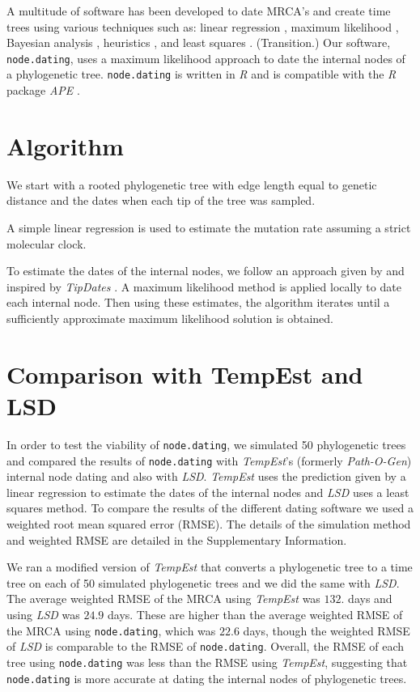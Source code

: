\documentclass{bioinfo}
\newcommand{\code}[1]{{\tt #1}}
\begin{document}
A multitude of software has been developed to date MRCA's and create time trees using various techniques such as: linear regression \citep{Tempest}, maximum likelihood \citep{TipDates, r8ts, PAML}, Bayesian analysis \citep{BEAST}, heuristics \citep{UPGMA, TREBLE}, and least squares \citep{LSD}.
(Transition.)
Our software, \code{node.dating}, uses a maximum likelihood approach to date the internal nodes of a phylogenetic tree.
\code{node.dating} is written in \emph{R} and is compatible with the \emph{R} package \emph{APE} \citep{APE}.


\section{Algorithm} \label{sec:alg}
We start with a rooted phylogenetic tree with edge length equal to genetic distance and the dates when each tip of the tree was sampled.

A simple linear regression is used to estimate the mutation rate assuming a strict molecular clock.

To estimate the dates of the internal nodes, we follow an approach given by \cite{Felsenstein81} and inspired by \emph{TipDates} \citep{TipDates}.
A maximum likelihood method is applied locally to date each internal node.
Then using these estimates, the algorithm iterates until a sufficiently approximate maximum likelihood solution is obtained.

\section{Comparison with TempEst and LSD} \label{sec:tempest}
In order to test the viability of \code{node.dating}, we simulated 50 phylogenetic trees and compared the results of \code{node.dating} with \emph{TempEst}'s (formerly \emph{Path-O-Gen}) internal node dating and also with \emph{LSD}.
\emph{TempEst} uses the prediction given by a linear regression to estimate the dates of the internal nodes and \emph{LSD} uses a least squares method.
To compare the results of the different dating software we used a weighted root mean squared error (RMSE).
The details of the simulation method and weighted RMSE are detailed in the Supplementary Information.

We ran a modified version of \emph{TempEst} that converts a phylogenetic tree to a time tree on each of 50 simulated phylogenetic trees and we did the same with \emph{LSD}.
The average weighted RMSE of the MRCA using \emph{TempEst} was $132.$ days and using \emph{LSD} was $24.9$ days.
These are higher than the average weighted RMSE of the MRCA using \code{node.dating}, which was $22.6$ days, though the weighted RMSE of \emph{LSD} is comparable to the RMSE of \code{node.dating}.
Overall, the RMSE of each tree using \code{node.dating} was less than the RMSE using \emph{TempEst}, suggesting that \code{node.dating} is more accurate at dating the internal nodes of phylogenetic trees.
\end{document}
